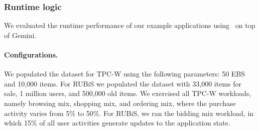 \subsubsection{Runtime logic}
We evaluated the runtime performance of our example
applications using \tool\ on top of Gemini.




\paragraph{Configurations.}  We populated the dataset for TPC-W using the
following parameters: 50 EBS and 10,000 items. For RUBiS we populated
the dataset with 33,000 items for sale, 1 million users, and 500,000
old items. We exercised all TPC-W workloads, namely browsing mix,
shopping mix, and ordering mix, where the purchase activity varies
from 5\% to 50\%. For RUBiS, we ran the bidding mix workload, in which
15\% of all user activities generate updates to the application state.
% 
% 

